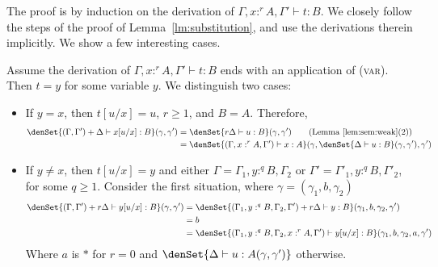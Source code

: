 \documentclass[a4paper,UKenglish,cleveref, autoref, thm-restate]{lipics-v2021}
\newcommand{\ts}{\vdash}
\newcommand{\hastype}[3]{#1\ts #2 : #3}
\begin{document}
The proof is by induction on the derivation of $\hastype{\Gamma, x:^rA,\Gamma'}{t}{B}$. 
We closely follow the steps of the proof of Lemma~\ref{lm:substitution}, and use the derivations therein implicitly.
We show a few interesting cases.
\begin{description}[font=\sc,wide]
\item[Case (var):] Assume the derivation of $\hastype{\Gamma, x:^rA,\Gamma'}{t}{B}$ ends with an application of (\textsc{var}). Then $t = y$ for some variable $y$. We distinguish two cases:
\begin{itemize}
    \item If $y=x$, then $t[u/x] = u$, $r\geq 1$, and $B = A$. Therefore,
    \begin{align*}
    \denSet{\hastype{(\Gamma,\Gamma')+\Delta}{x[u/x]}{B}}(\gamma,\gamma')
    &= \denSet{\hastype{r\Delta}{u}{B}}(\gamma,\gamma') 
    \tag{Lemma~\ref{lem:sem:weak}(2)} \\
    &=\denSet{\hastype{(\Gamma,x:^rA,\Gamma')}{x}{A}}(\gamma,\denSet{\hastype{\Delta}{u}{B}}(\gamma,\gamma'),\gamma')
    \end{align*}

    \item If $y\neq x$, then $t[u/x] = y$ and either $\Gamma = \Gamma_1, y:^q B, \Gamma_2$ or $\Gamma' = \Gamma'_1, y:^q B, \Gamma'_2$, for some $q\geq 1$. 
    Consider the first situation, where $\gamma = (\gamma_1,b,\gamma_2)$
    \begin{align*}
    \denSet{\hastype{(\Gamma,\Gamma')+r\Delta}{y[u/x]}{B}}(\gamma,\gamma') 
    &= \denSet{\hastype{(\Gamma_1,y:^qB,\Gamma_2,\Gamma')+r\Delta}{y}{B}}(\gamma_1,b,\gamma_2,\gamma') \\
    &=b \\
    &=\denSet{\hastype{(\Gamma_1,y:^qB,\Gamma_2,x:^rA,\Gamma')}{y[u/x]}{B}}(\gamma_1,b,\gamma_2,a,\gamma')
    \end{align*}
    Where $a$ is $*$ for $r=0$ and $\denSet{\hastype{\Delta}{u}{A}(\gamma,\gamma')}$ otherwise.
\end{itemize}    


\end{description}
\end{document}

